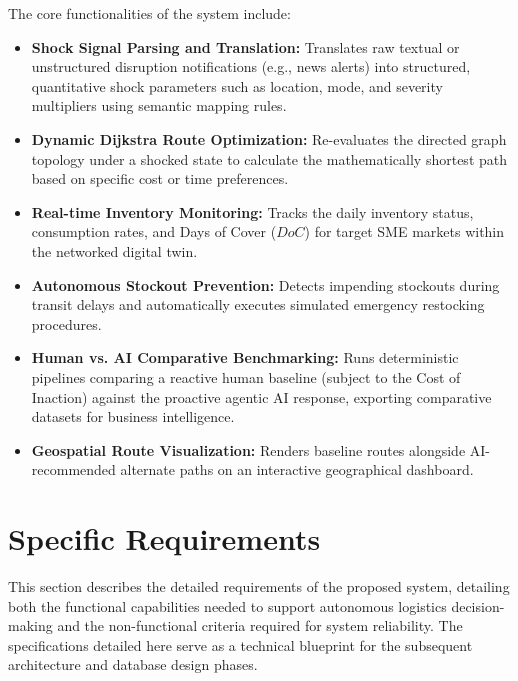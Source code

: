 The core functionalities of the system include:
\begin{itemize}
    \item \textbf{Shock Signal Parsing and Translation:} Translates raw textual or unstructured disruption notifications (e.g., news alerts) into structured, quantitative shock parameters such as location, mode, and severity multipliers using semantic mapping rules.
    \item \textbf{Dynamic Dijkstra Route Optimization:} Re-evaluates the directed graph topology under a shocked state to calculate the mathematically shortest path based on specific cost or time preferences.
    \item \textbf{Real-time Inventory Monitoring:} Tracks the daily inventory status, consumption rates, and Days of Cover ($DoC$) for target SME markets within the networked digital twin.
    \item \textbf{Autonomous Stockout Prevention:} Detects impending stockouts during transit delays and automatically executes simulated emergency restocking procedures.
    \item \textbf{Human vs. AI Comparative Benchmarking:} Runs deterministic pipelines comparing a reactive human baseline (subject to the Cost of Inaction) against the proactive agentic AI response, exporting comparative datasets for business intelligence.
    \item \textbf{Geospatial Route Visualization:} Renders baseline routes alongside AI-recommended alternate paths on an interactive geographical dashboard.
\end{itemize}
\section[Specific Requirements]{Specific Requirements}
This section describes the detailed requirements of the proposed system, detailing both the functional capabilities needed to support autonomous logistics decision-making and the non-functional criteria required for system reliability. The specifications detailed here serve as a technical blueprint for the subsequent architecture and database design phases.
